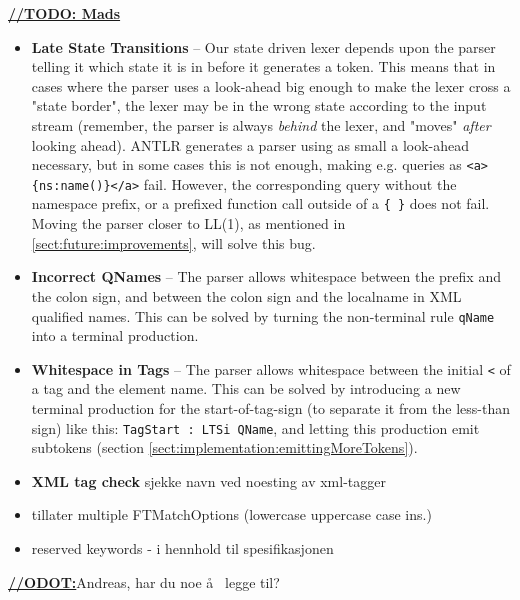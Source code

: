 \underline{\textbf{\LARGE //TODO: Mads}}
\begin{itemize}
\item \textbf{Late State Transitions} -- Our state driven lexer depends upon the parser telling it which state it is in before it generates a token. This means that in cases where the parser uses a look-ahead big enough to make the lexer cross a "state border", the lexer may be in the wrong state according to the input stream (remember, the parser is always \emph{behind} the lexer, and "moves" \emph{after} looking ahead). ANTLR generates a parser using as small a look-ahead necessary, but in some cases this is not enough, making e.g. queries as \verb!<a>{ns:name()}</a>! fail. However, the corresponding query without the namespace prefix, or a prefixed function call outside of a \verb!{ }! does not fail. Moving the parser closer to LL(1), as mentioned in \ref{sect:future:improvements}, will solve this bug.

\item \textbf{Incorrect QNames} -- The parser allows whitespace between the prefix and the colon sign, and between the colon sign and the localname in XML qualified names. This can be solved by turning the non-terminal rule \verb!qName! into a terminal production.

\item \textbf{Whitespace in Tags} -- The parser allows whitespace between the initial \verb!<! of a tag and the element name. This can be solved by introducing a new terminal production for the start-of-tag-sign (to separate it from the less-than sign) like this: \verb!TagStart : LTSi QName!, and letting this production emit subtokens (section \ref{sect:implementation:emittingMoreTokens}).


\item \textbf{XML tag check} sjekke navn ved noesting av xml-tagger
\item tillater multiple FTMatchOptions (lowercase uppercase case ins.)
\item reserved keywords - i hennhold til spesifikasjonen
\end{itemize}

\underline{\textbf{\LARGE //ODOT:}}Andreas, har du noe \aa~ legge til?




